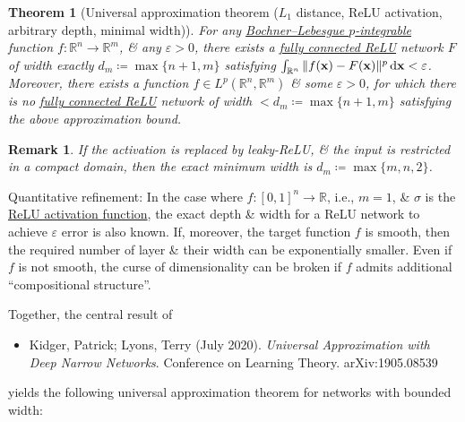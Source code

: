 \documentclass{article}
\newtheorem{remark}{Remark}
\newtheorem{theorem}{Theorem}
\begin{document}
\begin{theorem}[Universal approximation theorem ($L_1$ distance, ReLU activation, arbitrary depth, minimal width)]
	For any \href{https://en.wikipedia.org/wiki/Bochner_integral}{Bochner--Lebesgue $p$-integrable} function $f:\mathbb{R}^n\to\mathbb{R}^m$, \& any $\varepsilon > 0$, there exists a \href{https://en.wikipedia.org/wiki/Fully_connected_network}{fully connected ReLU} network $F$ of width exactly $d_m\coloneqq\max\{n + 1,m\}$ satisfying $\int_{\mathbb{R}^n} \|f({\bf x}) - F({\bf x})\|^p\,{\rm d}{\bf x} < \varepsilon$. Moreover, there exists a function $f\in L^p(\mathbb{R}^n,\mathbb{R}^m)$ \& some $\varepsilon > 0$, for which there is no \href{https://en.wikipedia.org/wiki/Fully_connected_network}{fully connected ReLU} network of width $< d_m\coloneqq\max\{n + 1,m\}$ satisfying the above approximation bound.
\end{theorem}

\begin{remark}
	If the activation is replaced by leaky-ReLU, \& the input is restricted in a compact domain, then the exact minimum width is $d_m\coloneqq\max\{m,n,2\}$.
\end{remark}
{\sf Quantitative refinement}: In the case where $f:[0,1]^n\to\mathbb{R}$, i.e., $m = 1$, \& $\sigma$ is the \href{https://en.wikipedia.org/wiki/Rectifier_(neural_networks)}{ReLU activation function}, the exact depth \& width for a ReLU network to achieve $\varepsilon$ error is also known. If, moreover, the target function $f$ is smooth, then the required number of layer \& their width can be exponentially smaller. Even if $f$ is not smooth, the curse of dimensionality can be broken if $f$ admits additional ``compositional structure''.

Together, the central result of
\begin{itemize}
	\item {\sc Kidger, Patrick; Lyons, Terry} (July 2020). {\it Universal Approximation with Deep Narrow Networks}. Conference on Learning Theory. arXiv:1905.08539
\end{itemize}
yields the following universal approximation theorem for networks with bounded width:
\end{document}
